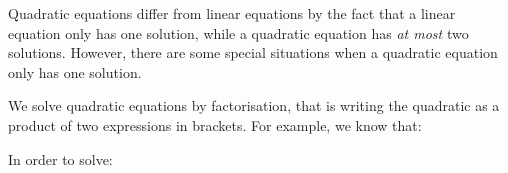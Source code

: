       \label{m39247*id149478}Quadratic equations differ from linear equations by the fact that a linear
equation only has one solution, while a quadratic equation has \textsl{at most}
two solutions. However, there are some special situations when a quadratic equation only
has one solution.\par 
      \label{m39247*id149489}We solve quadratic equations by factorisation, that is writing the quadratic as
a product of two expressions in brackets. For example, we know that:\par 
      \label{m39247*id149493}\nopagebreak\noindent{}
      \label{m39247*id149552}In order to solve:\par 
      \label{m39247*id149557}\nopagebreak\noindent{}
